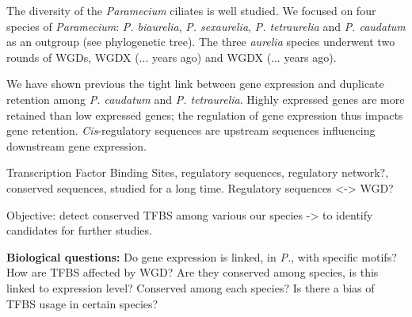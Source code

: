 The diversity of the \textit{Paramecium} ciliates is well studied. We focused on four species of \textit{Paramecium}: \textit{P. biaurelia}, \textit{P. sexaurelia}, \textit{P. tetraurelia} and \textit{P. caudatum} as an outgroup (see phylogenetic tree). The three \textit{aurelia} species underwent two rounds of WGDs, WGDX (... years ago) and WGDX (... years ago).

We have shown previous the tight link between gene expression and duplicate retention among \textit{P. caudatum} and \textit{P. tetraurelia}. Highly expressed genes are more retained than low expressed genes; the regulation of gene expression thus impacts gene retention. \textit{Cis}-regulatory sequences are upstream sequences influencing downstream gene expression.

Transcription Factor Binding Sites, regulatory sequences, regulatory network?, conserved sequences, studied for a long time. Regulatory sequences <-> WGD?

Objective: detect conserved TFBS among various our species -> to identify candidates for further studies.

\textbf{Biological questions:} Do gene expression is linked, in \textit{P.}, with specific motifs? How are TFBS affected by WGD? Are they conserved among species, is this linked to expression level? Conserved among each species? Is there a bias of TFBS usage in certain species?
